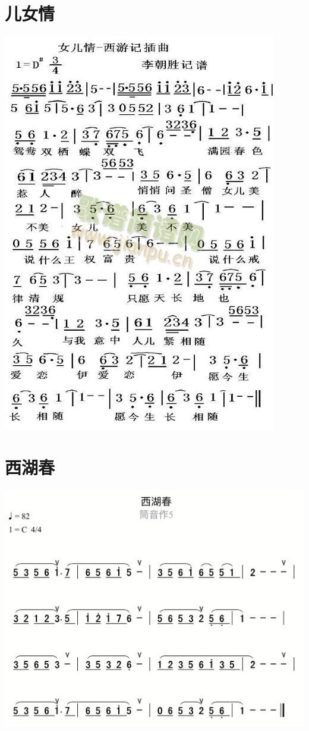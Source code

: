 \documentclass[cn,pad,chinese,chinesefont=nofont]{elegantbook}
\begin{document}
\section{儿女情}          
	\includegraphics[width=0.9\textwidth]{dongxiao/西游记-儿女情} 
\section{西湖春}          
	\includegraphics[width=\textwidth]{dongxiao/IMG_0860-西湖春.png} 
\end{document}
